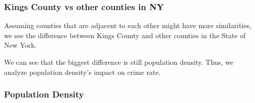 \documentclass{beamer}
\begin{document}
\begin{frame}[fragile]
\frametitle{Kings County vs other counties in NY}
Assuming counties that are adjacent to each other might have more similarities, we see the difference between Kings County and other counties in the State of New York.
\begin{center}
\end{center}
We can see that the biggest difference is still population density. Thus, we analyze population density's impact on crime rate.
\end{frame}

\begin{frame}[fragile]
\frametitle{Population Density}
\begin{center}
\end{center}
\end{frame}
\end{document}
